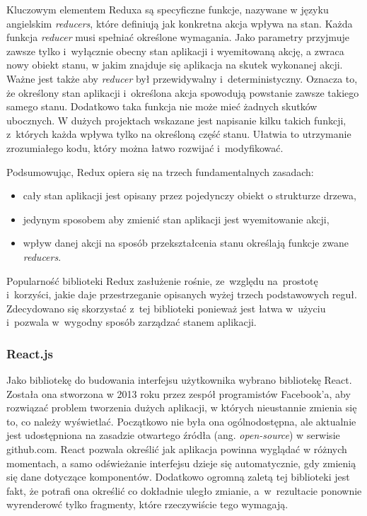 \documentclass[11pt,a4paper,polish,thesis]{dcsbook}
\begin{document}
	Kluczowym elementem Reduxa są specyficzne funkcje, nazywane w języku angielskim \textit{reducers}, które definiują jak konkretna akcja wpływa na stan. Każda funkcja \textit{reducer} musi spełniać określone wymagania. Jako parametry przyjmuje zawsze tylko i~wyłącznie obecny stan aplikacji i wyemitowaną akcję, a zwraca nowy obiekt stanu, w jakim znajduje się aplikacja na skutek wykonanej akcji. Ważne jest także aby \textit{reducer} był przewidywalny i~deterministyczny. Oznacza to, że określony stan aplikacji i~określona akcja spowodują powstanie zawsze takiego samego stanu. Dodatkowo taka funkcja nie może mieć żadnych skutków ubocznych. W dużych projektach wskazane jest napisanie kilku takich funkcji, z~których każda wpływa tylko na określoną część stanu. Ułatwia to utrzymanie zrozumiałego kodu, który można łatwo rozwijać i~modyfikować.
	
	Podsumowując, Redux opiera się na trzech fundamentalnych zasadach:	
	\begin{itemize}
		\item cały stan aplikacji jest opisany przez pojedynczy obiekt o strukturze drzewa,
		\item jedynym sposobem aby zmienić stan aplikacji jest wyemitowanie akcji,
		\item wpływ danej akcji na sposób przekształcenia stanu określają funkcje zwane \textit{reducers}.
	\end{itemize}

	Popularność biblioteki Redux zasłużenie rośnie, ze~względu na~prostotę i~korzyści, jakie daje przestrzeganie opisanych wyżej trzech podstawowych reguł. Zdecydowano się skorzystać z~tej biblioteki ponieważ jest łatwa w~użyciu i~pozwala w~wygodny sposób zarządzać stanem aplikacji. 
	
	\subsubsection{React.js}
	 
	 Jako bibliotekę do budowania interfejsu użytkownika wybrano bibliotekę React. 
	 Została ona stworzona w 2013 roku przez zespół programistów Facebook'a, aby rozwiązać problem tworzenia dużych aplikacji, w których nieustannie zmienia się to, co należy wyświetlać. Początkowo nie była ona ogólnodostępna, ale aktualnie jest udostępniona na zasadzie otwartego źródła (ang. \textit{open-source}) w serwisie github.com. React pozwala określić jak aplikacja powinna wyglądać w różnych momentach, a samo odświeżanie interfejsu dzieje się automatycznie, gdy zmienią się dane dotyczące komponentów. Dodatkowo ogromną zaletą tej biblioteki jest fakt, że potrafi ona określić co dokładnie uległo zmianie, a~w~rezultacie ponownie wyrenderowć tylko fragmenty, które rzeczywiście tego wymagają.
	 
\end{document}
